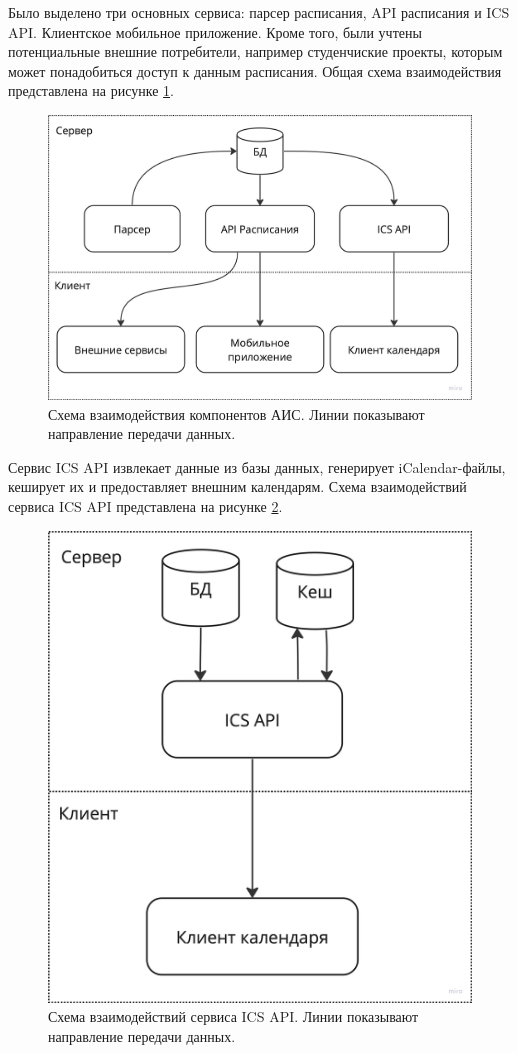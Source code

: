 Было выделено три основных сервиса: парсер расписания, API расписания и ICS API.
Клиентское мобильное приложение. Кроме того, были учтены потенциальные внешние потребители,
например студенчиские проекты, которым может понадобиться доступ к данным расписания.
Общая схема взаимодействия представлена на рисунке \ref{fig:schemes:overal}.

\begin{figure}
  \centering
  \includegraphics[width=0.8\linewidth]{images/schemes/overal.png}
  \caption{Схема взаимодействия компонентов АИС. Линии показывают направление передачи данных.}
  \label{fig:schemes:overal}
\end{figure}

Сервис ICS API извлекает данные из базы данных, генерирует
iCalendar-файлы, кеширует их и предоставляет внешним календарям.
Схема взаимодействий сервиса ICS API представлена на рисунке \ref{fig:schemes:ics}.

\begin{figure}
  \centering
  \includegraphics[width=0.8\linewidth]{images/schemes/ics.png}
  \caption{Схема взаимодействий сервиса ICS API. Линии показывают направление передачи данных.}
  \label{fig:schemes:ics}
\end{figure}

